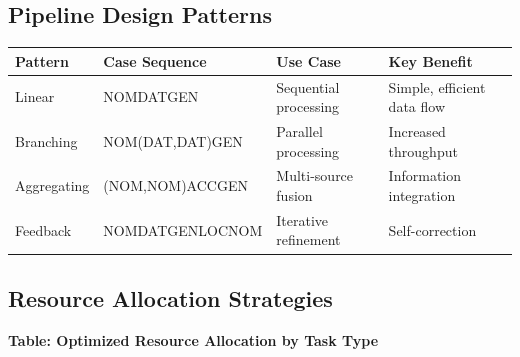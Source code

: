 \documentclass[
  11pt,
  letterpaper,
]{article}
\begin{document}
\hypertarget{pipeline-design-patterns}{%
\subsection{Pipeline Design Patterns}\label{pipeline-design-patterns}}

\begin{longtable}[]{@{}llll@{}}
\toprule
Pattern & Case Sequence & Use Case & Key Benefit\tabularnewline
\midrule
\endhead
Linear & NOMDATGEN & Sequential processing & Simple, efficient data
flow\tabularnewline
Branching & NOM(DAT,DAT)GEN & Parallel processing & Increased
throughput\tabularnewline
Aggregating & (NOM,NOM)ACCGEN & Multi-source fusion & Information
integration\tabularnewline
Feedback & NOMDATGENLOCNOM & Iterative refinement &
Self-correction\tabularnewline
\bottomrule
\end{longtable}

\hypertarget{resource-allocation-strategies}{%
\subsection{Resource Allocation
Strategies}\label{resource-allocation-strategies}}

\textbf{Table: Optimized Resource Allocation by Task Type}
\end{document}
